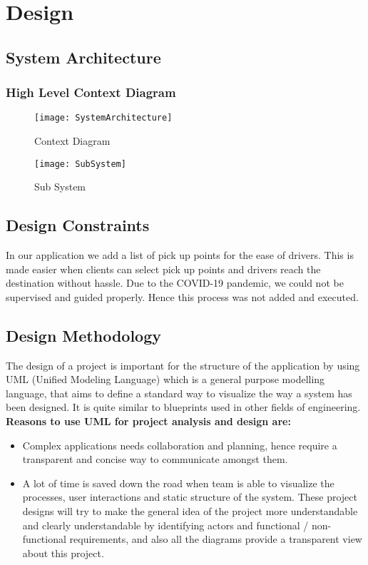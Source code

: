 \chapter{Design} \label{chap:design}

\section{System Architecture}
  
\subsection{High Level Context Diagram}
\begin{figure}[ht]
\center
\texttt{[image: SystemArchitecture]}
\caption{Context Diagram}
\label{fig:Context Diagram}
\end{figure}
\begin{figure}[ht]
\center
\texttt{[image: SubSystem]}
\caption{Sub System}
\label{fig:SubSystem}
\end{figure}

\section{Design Constraints} 
In our application we add a list of pick up points for the ease of drivers. This is made easier when clients can select pick up points and drivers reach the destination without hassle. Due to the COVID-19 pandemic, we could not be supervised and guided properly. Hence this process was not added and executed.

\section{Design Methodology}
The design of a project is important for the structure of the application by using UML (Unified Modeling Language) which is a general purpose modelling language, that aims to define a standard way to visualize the way a system has been designed. It is quite similar to blueprints used in other fields of engineering.
\\ \textbf{Reasons to use UML for project analysis and design are:} 

\begin{itemize}
\item Complex applications needs collaboration and planning, hence require a transparent and concise way to communicate amongst them.
\item A lot of time is saved down the road when team is able to visualize the processes, user interactions and static structure of the system. These project designs will try to make the general idea of the project more understandable and clearly understandable by identifying actors and functional / non-functional requirements, and also all the diagrams provide a transparent view about this project.
\end{itemize}



